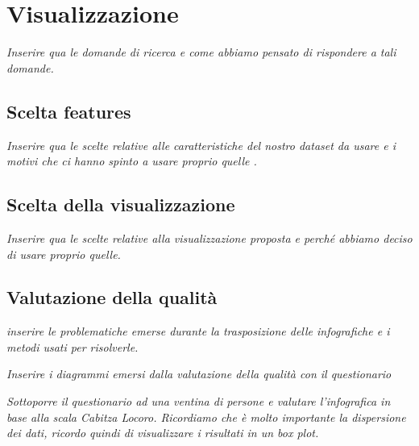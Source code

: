 \documentclass[10pt, a4paper,openany]{article}
\begin{document}
\section*{Visualizzazione}

\textit{Inserire qua le domande di ricerca e come abbiamo pensato di rispondere a tali domande.}

\subsection*{Scelta features}
\textit{Inserire qua le scelte relative alle caratteristiche del nostro dataset da usare e i motivi che ci hanno spinto a usare proprio quelle .}
\subsection*{Scelta della visualizzazione}
\textit{Inserire qua le scelte relative alla visualizzazione proposta e perché abbiamo deciso di usare proprio quelle.}
\subsection*{Valutazione della qualità}
\textit{inserire le problematiche emerse durante la trasposizione delle infografiche e i metodi usati per risolverle.}

\textit{Inserire i diagrammi emersi dalla valutazione della qualità con il questionario}

\textit{Sottoporre il questionario ad una ventina di persone e valutare l'infografica in base alla scala Cabitza Locoro. Ricordiamo che è molto importante la dispersione dei dati, ricordo quindi di visualizzare i risultati in un box plot.}
\end{document}
